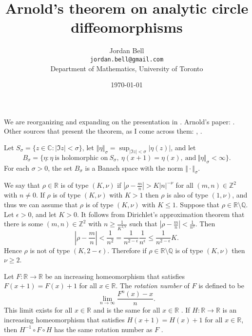 \documentclass{article}
\newcommand{\norm}[1]{\Vert #1 \Vert}
\begin{document}
\title{Arnold's theorem on analytic circle diffeomorphisms}
\author{Jordan Bell\\ \texttt{jordan.bell@gmail.com}\\Department of Mathematics, University of Toronto}

\date{\today}

\maketitle

We are reorganizing and expanding on the presentation in \cite{wayne}. Arnold's paper: \cite{malye}. Other sources that present the theorem, as I come across them: \cite{MR947141}, \cite{MR1230383}. 

Let $S_\sigma=\{z \in \mathbb{C}: |\Im z |< \sigma\}$,
let $\norm{\eta}_\sigma=\sup_{|\Im z|<\sigma} |\eta(z)|$, 
and let \[
B_\sigma=\{\eta: \eta \ \text{is holomorphic on} \ S_\sigma, \ \eta(x+1)=\eta(x), \ \text{and} \ \norm{\eta}_\sigma<\infty\}.
\]
For each $\sigma>0$, the set $B_\sigma$ is a Banach space with the norm $\norm{\cdot}_\sigma$.

We say that $\rho \in \mathbb{R}$ is of type $(K,\nu)$ if $|\rho-\frac{m}{n}|>K|n|^{-\nu}$ for all
$(m,n) \in \mathbb{Z}^2$ with $n \neq 0$.
If $\rho$ is of type $(K,\nu)$ with $K >1$ then $\rho$ is also of type $(1,\nu)$,  and thus we can assume that $\rho$ is of type $(K,\nu)$ with $K \leq 1$.
Suppose that $\rho \in \mathbb{R} \setminus \mathbb{Q}$. Let $\epsilon>0$, and let $K>0$. It follows from Dirichlet's approximation theorem \cite[p. 155, Theorem 185]{MR2445243} that there is some $(m,n) \in \mathbb{Z}^2$ with $n \geq \frac{1}{K^{1/\epsilon}}$ such that $|\rho - \frac{m}{n}| < \frac{1}{n^2}$. Then
\[
|\rho-\frac{m}{n}|<\frac{1}{n^2}=\frac{1}{n^{2-\epsilon}} \frac{1}{n^\epsilon}
\leq \frac{1}{n^{2-\epsilon}} K.
\]
Hence $\rho$ is not of type $(K,2-\epsilon)$. Therefore if $\rho \in \mathbb{R} \setminus \mathbb{Q}$ is of type $(K,\nu)$ then $\nu \geq 2$.

Let $F:\mathbb{R} \to \mathbb{R}$ be an increasing homeomorphism that satisfies $F(x+1)=F(x)+1$ for all $x \in \mathbb{R}$. The {\em rotation number} of $F$ is defined to be
\[
\lim_{n \to \infty} \frac{F^n(x)-x}{n}.
\]
This limit exists for all $x \in \mathbb{R}$ and is the same for all $x \in \mathbb{R}$ \cite[p. 387, Proposition 11.1.1]{katok}. If $H:\mathbb{R} \to \mathbb{R}$ is an increasing homeomorphism that satisfies $H(x+1)=H(x)+1$ for all $x \in \mathbb{R}$, then $H^{-1} \circ F \circ H$ has the same rotation number as $F$ \cite[p. 388, Proposition 11.1.3]{katok}.
\end{document}

